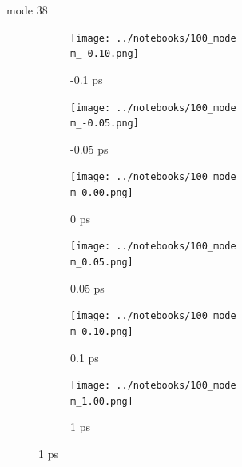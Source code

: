\documentclass{beamer}
\begin{document}
\renewcommand\m{38}
\begin{frame}{mode \m}
	\begin{figure}
		\centering
		\begin{subfigure}[b]{\w\textwidth}
			\centering
			\texttt{[image: ../notebooks/100\_mode\\m\_-0.10.png]}
			\caption{-0.1 ps}
		\end{subfigure}
		\begin{subfigure}[b]{\w\textwidth}
			\centering
			\texttt{[image: ../notebooks/100\_mode\\m\_-0.05.png]}
			\caption{-0.05 ps}
		\end{subfigure}
		\begin{subfigure}[b]{\w\textwidth}
			\centering
			\texttt{[image: ../notebooks/100\_mode\\m\_0.00.png]}
			\caption{0 ps}
		\end{subfigure}
		\begin{subfigure}[b]{\w\textwidth}
			\centering
			\texttt{[image: ../notebooks/100\_mode\\m\_0.05.png]}
			\caption{0.05 ps}
		\end{subfigure}
		\begin{subfigure}[b]{\w\textwidth}
			\centering
			\texttt{[image: ../notebooks/100\_mode\\m\_0.10.png]}
			\caption{0.1 ps}
		\end{subfigure}
		\begin{subfigure}[b]{\w\textwidth}
			\centering
			\texttt{[image: ../notebooks/100\_mode\\m\_1.00.png]}
			\caption{1 ps}
		\end{subfigure}
	\end{figure}
\end{frame}
\end{document}
